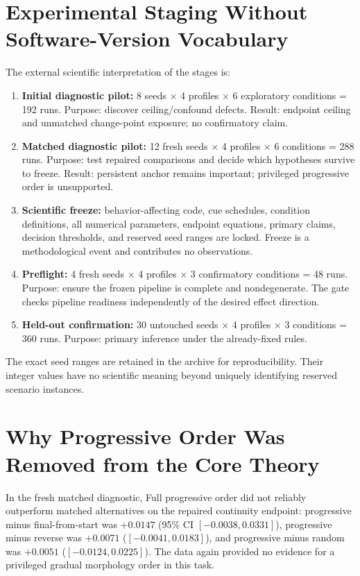 \documentclass[10pt,journal,onecolumn]{IEEEtran}
\begin{document}
\section{Experimental Staging Without Software-Version Vocabulary}
The external scientific interpretation of the stages is:
\begin{enumerate}
\item \textbf{Initial diagnostic pilot:} 8 seeds $\times$ 4 profiles $\times$ 6 exploratory conditions = 192 runs. Purpose: discover ceiling/confound defects. Result: endpoint ceiling and unmatched change-point exposure; no confirmatory claim.
\item \textbf{Matched diagnostic pilot:} 12 fresh seeds $\times$ 4 profiles $\times$ 6 conditions = 288 runs. Purpose: test repaired comparisons and decide which hypotheses survive to freeze. Result: persistent anchor remains important; privileged progressive order is unsupported.
\item \textbf{Scientific freeze:} behavior-affecting code, cue schedules, condition definitions, all numerical parameters, endpoint equations, primary claims, decision thresholds, and reserved seed ranges are locked. Freeze is a methodological event and contributes no observations.
\item \textbf{Preflight:} 4 fresh seeds $\times$ 4 profiles $\times$ 3 confirmatory conditions = 48 runs. Purpose: ensure the frozen pipeline is complete and nondegenerate. The gate checks pipeline readiness independently of the desired effect direction.
\item \textbf{Held-out confirmation:} 30 untouched seeds $\times$ 4 profiles $\times$ 3 conditions = 360 runs. Purpose: primary inference under the already-fixed rules.
\end{enumerate}

The exact seed ranges are retained in the archive for reproducibility. Their integer values have no scientific meaning beyond uniquely identifying reserved scenario instances.

\section{Why Progressive Order Was Removed from the Core Theory}
In the fresh matched diagnostic, Full progressive order did not reliably outperform matched alternatives on the repaired continuity endpoint: progressive minus final-from-start was $+0.0147$ (95\% CI $[-0.0038,0.0331]$), progressive minus reverse was $+0.0071$ ($[-0.0041,0.0183]$), and progressive minus random was $+0.0051$ ($[-0.0124,0.0225]$). The data again provided no evidence for a privileged gradual morphology order in this task.
\end{document}
